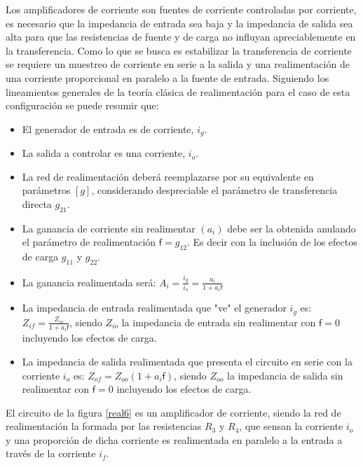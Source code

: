 \hspace{10pt} Los amplificadores de corriente son fuentes de corriente
controladas por corriente, es necesario que la impedancia de entrada
sea baja y la impedancia de salida sea alta para que las
resistencias de fuente y de carga no influyan apreciablemente en la
transferencia. Como lo que se busca es estabilizar la transferencia
de corriente se requiere un muestreo de corriente en serie a la 
salida y una realimentación de una corriente proporcional en paralelo a
la fuente de entrada. Siguiendo los lineamientos generales de la teoría clásica de realimentación \cite{gray95} para el caso de esta configuración se puede resumir que: 

\begin{itemize}
	\item El generador de entrada es de corriente, $i_g$.
	\item La salida a controlar es una corriente, $i_o$.
	\item La red de realimentación deberá reemplazarse por su equivalente en parámetros $[g]$, considerando despreciable el parámetro de transferencia directa $g_{21}$.
	\item La ganancia de corriente sin realimentar $(a_i)$ debe ser la obtenida anulando el parámetro de realimentación $\textsf{f}=g_{12}$. Es decir con la inclusión de los efectos de carga $g_{11}$ y $g_{22}$.
	\item La ganancia realimentada será: $A_i=\frac{\displaystyle i_g}{\displaystyle i_o}=\frac{\displaystyle a_i}{\displaystyle 1+a_i\textsf{f}}$ 
	\item La impedancia de entrada realimentada que "ve" el generador $i_g$ es: $Z_{if}=\frac{\displaystyle Z_{io}}{\displaystyle 1+a_i\textsf{f}}$, siendo $Z_{io}$ la impedancia de entrada sin realimentar con $\textsf{f}=0$ incluyendo los efectos de carga.
	\item La impedancia de salida realimentada que presenta el circuito en serie con la corriente $i_o$ es: $Z_{of}=Z_{oo}(1+a_i\textsf{f})$, siendo $Z_{oo}$ la impedancia de salida sin realimentar con $\textsf{f}=0$ incluyendo los efectos de carga.
\end{itemize} 


El circuito de la figura \ref{real6} es un amplificador de corriente, siendo la red de realimentación la formada por las resistencias $R_3$ y $R_4$, que sensan la corriente $i_o$ y una proporción de dicha corriente es realimentada en paralelo a la entrada a través de la corriente $i_f$.

